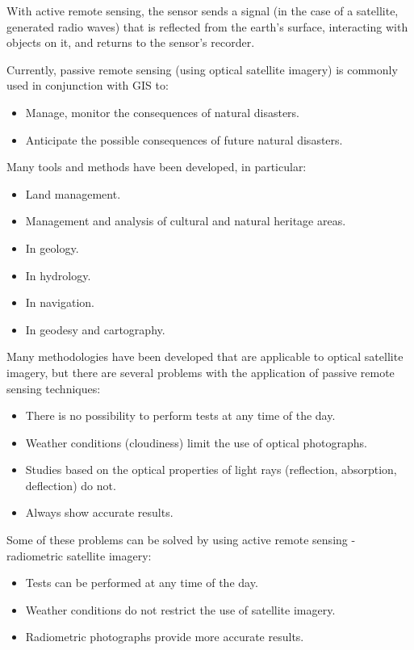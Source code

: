 {{	With active remote sensing, the sensor sends a signal (in the case of a satellite, generated radio waves) that is reflected from the earth's surface, interacting with objects on it, and returns to the sensor's recorder.
	
	Currently, passive remote sensing (using optical satellite imagery) is commonly used in conjunction with GIS to:

	\begin{itemize}
		\item Manage, monitor the consequences of natural disasters.
		\item Anticipate the possible consequences of future natural disasters.
	\end{itemize}
	
	Many tools and methods have been developed, in particular:
	
	\begin{itemize}
		\item Land management.
		\item Management and analysis of cultural and natural heritage areas.
		\item In geology.
		\item In hydrology.
		\item In navigation.
		\item In geodesy and cartography.
	\end{itemize}

	Many methodologies have been developed that are applicable to optical satellite imagery, but there are several problems with the application of passive remote sensing techniques:
	
	\begin{itemize}
		\item There is no possibility to perform tests at any time of the day.
		\item Weather conditions (cloudiness) limit the use of optical photographs.
		\item Studies based on the optical properties of light rays (reflection, absorption, deflection) do not. \item Always show accurate results.
	\end{itemize}

	Some of these problems can be solved by using active remote sensing - radiometric satellite imagery:
	
	\begin{itemize}
		\item Tests can be performed at any time of the day.
		\item Weather conditions do not restrict the use of satellite imagery.
		\item Radiometric photographs provide more accurate results.
	\end{itemize}

}}
